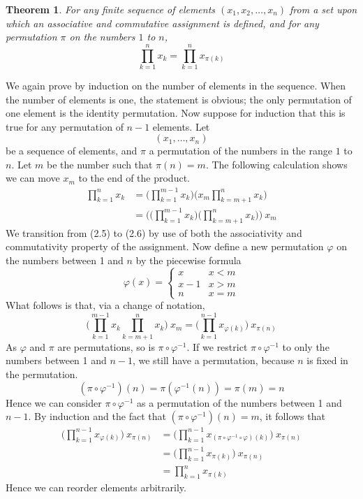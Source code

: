 \documentclass[12pt]{amsbook}
\makeatletter
\theoremstyle{plain}
\newtheorem{theorem}{Theorem}[chapter]
\theoremstyle{definition}
\renewenvironment{proof}[1][\proofname]{\par
  \pushQED{\qed}%
  \normalfont \topsep6\p@\@plus6\p@\relax
  \list{}{\leftmargin=0em
          \rightmargin=\leftmargin
          \settowidth{\itemindent}{\itshape#1}%
          \labelwidth=\itemindent}

  \item[\hskip\labelsep
        \itshape
    #1\@addpunct{.}]\ignorespaces
}{%
  \popQED\endlist\@endpefalse
}
\makeatother
\begin{document}
\begin{theorem}
    For any finite sequence of elements $(x_1, x_2, \dots, x_n)$ from a set upon which an associative and commutative assignment is defined, and for any permutation $\pi$ on the numbers $1$ to $n$,
    \[ \prod_{k=1}^n x_k = \prod_{k=1}^n x_{\pi(k)} \]
\end{theorem}
\begin{proof}
    We again prove by induction on the number of elements in the sequence. When the number of elements is one, the statement is obvious; the only permutation of one element is the identity permutation. Now suppose for induction that this is true for any permutation of $n-1$ elements. Let
    \[ (x_1, \dots, x_n) \]
    be a sequence of elements, and $\pi$ a permutation of the numbers in the range $1$ to $n$. Let $m$ be the number such that $\pi(n) = m$. The following calculation shows we can move $x_m$ to the end of the product.
    \begin{align}
    \prod_{k=1}^n x_k &= \big( \prod_{k=1}^{m-1} x_k \big) \big( x_m \prod_{k=m+1}^n x_k \big)\\
    &= \Big( \big( \prod_{k=1}^{m-1} x_k \big) \big( \prod_{k=m+1}^n x_k \big) \Big)\ x_m
    \end{align}
    We transition from (2.5) to (2.6) by use of both the associativity and commutativity property of the assignment. Now define a new permutation $\varphi$ on the numbers between 1 and $n$ by the piecewise formula
    \[ \varphi(x) = \begin{cases} x   & x < m\\
                               x-1 & x > m\\
                               n   & x = m \end{cases} \]
    What follows is that, via a change of notation,
    \[ \big( \prod_{k=1}^{m-1} x_k \prod_{k=m+1}^n x_k \big)\ x_m = \big( \prod_{k=1}^{n-1} x_{\varphi(k)} \big)\ x_{\pi(n)} \]
    As $\varphi$ and $\pi$ are permutations, so is $\pi \circ \varphi^{-1}$. If we restrict $\pi \circ \varphi^{-1}$ to only the numbers between 1 and $n-1$, we still have a permutation, because $n$ is fixed in the permutation.
    \[(\pi \circ \varphi^{-1})(n) = \pi(\varphi^{-1}(n)) = \pi(m) = n \]
    Hence we can consider $\pi \circ \varphi^{-1}$ as a permutation of the numbers between 1 and $n-1$. By induction and the fact that $(\pi \circ \varphi^{-1})(n) = m$, it follows that
    \begin{align*}
        \big( \prod_{k=1}^{n-1} x_{\varphi(k)} \big)\ x_{\pi(n)} &= \big( \prod_{k=1}^{n-1} x_{(\pi \circ \varphi^{-1} \circ \varphi)(k)} \big)\ x_{\pi(n)}\\
        &= \big( \prod_{k=1}^{n-1} x_{\pi(k)} \big)\ x_{\pi(n)}\\
        &= \prod_{k=1}^n x_{\pi(k)}
    \end{align*}
    Hence we can reorder elements arbitrarily.
\end{proof}
\end{document}
